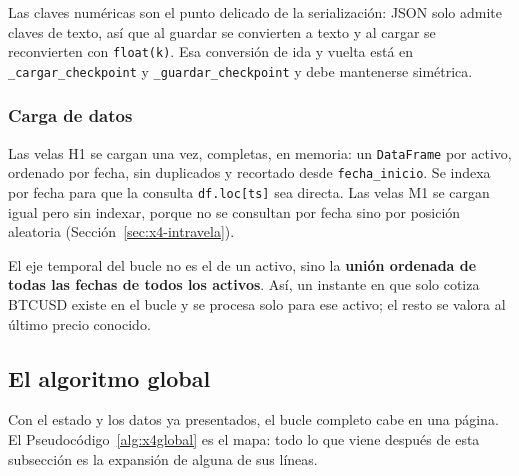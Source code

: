 \documentclass[11pt,a4paper]{article}
\newcommand{\code}[1]{\texttt{\small #1}}
\newcommand{\bigsep}{\par\vspace{3pt}}
\begin{document}
\bigsep
Las claves numéricas son el punto delicado de la serialización: JSON solo admite claves de
texto, así que al guardar se convierten a texto y al cargar se reconvierten con
\code{float(k)}. Esa conversión de ida y vuelta está en \code{_cargar_checkpoint} y
\code{_guardar_checkpoint} y debe mantenerse simétrica.

\subsubsection{Carga de datos}

Las velas H1 se cargan una vez, completas, en memoria: un \code{DataFrame} por activo,
ordenado por fecha, sin duplicados y recortado desde \code{fecha_inicio}. Se indexa por
fecha para que la consulta \code{df.loc[ts]} sea directa. Las velas M1 se cargan igual pero
sin indexar, porque no se consultan por fecha sino por posición aleatoria
(Sección~\ref{sec:x4-intravela}).

\bigsep
El eje temporal del bucle no es el de un activo, sino la \textbf{unión ordenada de todas
las fechas de todos los activos}. Así, un instante en que solo cotiza BTCUSD existe en el
bucle y se procesa solo para ese activo; el resto se valora al último precio conocido.

\subsection{El algoritmo global}

Con el estado y los datos ya presentados, el bucle completo cabe en una página. El
Pseudocódigo~\ref{alg:x4global} es el mapa: todo lo que viene después de esta subsección es
la expansión de alguna de sus líneas.
\end{document}
